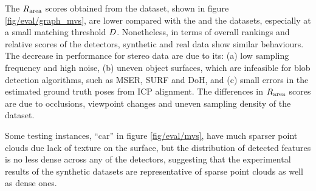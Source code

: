 The $R_\textrm{area}$ scores obtained from the \stereoset dataset, shown in figure \ref{fig/eval/graph_mvs}, are lower compared with the \meshset and the \mriset datasets, especially at a small matching threshold $D$. Nonetheless, in terms of overall rankings and relative scores of the detectors, synthetic and real data show similar behaviours. The decrease in performance for stereo data are due to its: (a) low sampling frequency and high noise, (b) uneven object surfaces, which are infeasible for blob detection algorithms, such as MSER, SURF and DoH, and (c) small errors in the estimated ground truth poses from ICP alignment.
The differences in $R_\textrm{area}$ scores are due to occlusions, viewpoint changes and uneven sampling density of the \stereoset dataset. 

Some testing instances, \eg ``car'' in figure \ref{fig/eval/mvs}, have much sparser point clouds due lack of texture on the surface, but the distribution of detected features is no less dense across any of the detectors, suggesting that the experimental results of the synthetic datasets are representative of sparse point clouds as well as dense ones.

